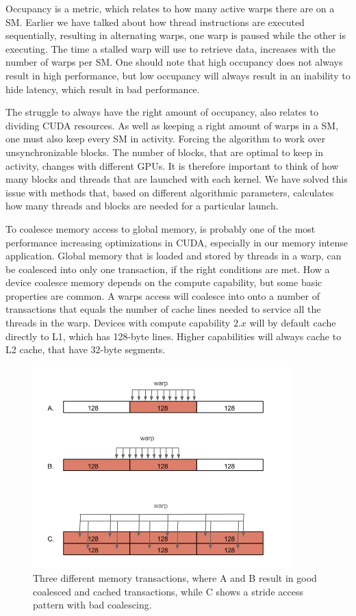 Occupancy is a metric, which relates to how many active warps there are on a SM. Earlier we have talked about how thread instructions are executed sequentially, resulting in alternating warps, one warp is paused while the other is executing. The time a stalled warp will use to retrieve data, increases with the number of warps per SM. One should note that high occupancy does not always result in high performance, but low occupancy will always result in an inability to hide latency, which result in bad performance.

The struggle to always have the right amount of occupancy, also relates to dividing CUDA resources. As well as keeping a right amount of warps in a SM, one must also keep every SM in activity. Forcing the algorithm to work over unsynchronizable blocks. The number of blocks, that are optimal to keep in activity, changes with different GPUs. It is therefore important to think of how many blocks and threads that are launched with each kernel. We have solved this issue with methods that, based on different algorithmic parameters, calculates how many threads and blocks are needed for a particular launch.

To coalesce memory access to global memory, is probably one of the most performance increasing optimizations in CUDA, especially in our memory intense application. Global memory that is loaded and stored by threads in a warp, can be coalesced into only one transaction, if the right conditions are met. How a device coalesce memory depends on the compute capability, but some basic properties are common. A warps access will coalesce into onto a number of transactions that equals the number of cache lines needed to service all the threads in the warp. Devices with compute capability $2.x$ will by default cache directly to L1, which has 128-byte lines. Higher capabilities will always cache to L2 cache, that have 32-byte segments\cite{cuda_c_best_practices_guide}. 

\begin{figure}[ht!]
    \centering
    \includegraphics[width=100mm]{../gfx/memory_coalecing.png}
    \caption{Three different memory transactions, where A and B result in good coalesced and cached transactions, while C shows a stride access pattern with bad coalescing.}
    \label{fig:coalesing_memory}
\end{figure}

